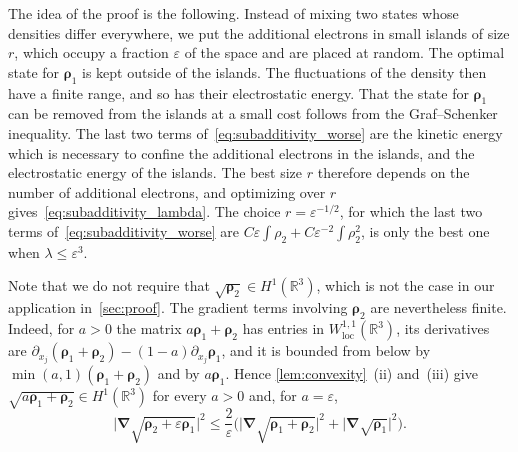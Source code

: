\documentclass[final,reqno]{amsart}
\theoremstyle{remark}
\renewcommand{\le}{\leqslant}
\renewcommand{\epsilon}{\varepsilon}
\newcommand{\RR}{\mathbb{R}}
\newcommand{\grad}{\bm{\nabla}}
\begin{document}
The idea of the proof is the following. Instead of mixing two states whose densities differ everywhere, we put the additional electrons in small islands of size $r$, which occupy a fraction $\epsilon$ of the space and are placed at random. The optimal state for $\bm{\rho}_1$ is kept outside of the islands. The fluctuations of the density then have a finite range, and so has their electrostatic energy. That the state for $\bm{\rho}_1$ can be removed from the islands at a small cost follows from the Graf--Schenker inequality. The last two terms of~\cref{eq:subadditivity_worse} are the kinetic energy which is necessary to confine the additional electrons in the islands, and the electrostatic energy of the islands. The best size $r$ therefore depends on the number of additional electrons, and optimizing over $r$ gives~\cref{eq:subadditivity_lambda}. The choice $r=\epsilon^{-1/2}$, for which the last two terms of~\cref{eq:subadditivity_worse} are $C\epsilon\int\rho_2+C\epsilon^{-2}\int\rho_2^2$, is only the best one when $\lambda\le\epsilon^3$.

Note that we do not require that $\sqrt{\bm{\rho}_2}\in H^1(\RR^3)$, which is not the case in our application in~\cref{sec:proof}. The gradient terms involving $\bm{\rho}_2$ are nevertheless finite. Indeed, for $a>0$ the matrix $a\bm{\rho}_1+\bm{\rho}_2$ has entries in $W^{1,1}_{\mathrm{loc}}(\RR^3)$, its derivatives are $\partial_{x_j}(\bm{\rho}_1+\bm{\rho}_2)-(1-a)\partial_{x_j}\bm{\rho}_1$, and it is bounded from below by $\min(a,1)(\bm{\rho}_1+\bm{\rho}_2)$ and by $a\bm{\rho}_1$. Hence \cref{lem:convexity}~(ii) and~(iii) give $\sqrt{a\bm{\rho}_1+\bm{\rho}_2}\in H^1(\RR^3)$ for every $a>0$ and, for $a=\epsilon$,
$$
\big|\grad\sqrt{\bm{\rho}_2+\epsilon\bm{\rho}_1}\big|^2\le\frac2\epsilon\Big(\big|\grad\sqrt{\bm{\rho}_1+\bm{\rho}_2}\big|^2+\big|\grad\sqrt{\bm{\rho}_1}\big|^2\Big).
$$
\end{document}
